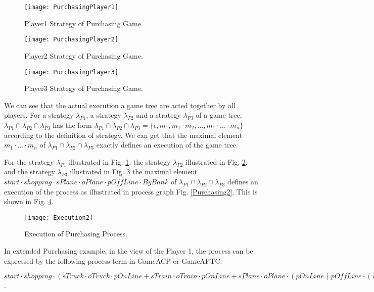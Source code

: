 \documentclass{fac}
\begin{document}
\begin{figure}
  \centering
\texttt{[image: PurchasingPlayer1]}
  \caption{Player1 Strategy of Purchasing Game.}
  \label{PurchasingPlayer1}
\end{figure}

\begin{figure}
  \centering
\texttt{[image: PurchasingPlayer2]}
  \caption{Player2 Strategy of Purchasing Game.}
  \label{PurchasingPlayer2}
\end{figure}

\begin{figure}
  \centering
\texttt{[image: PurchasingPlayer3]}
  \caption{Player3 Strategy of Purchasing Game.}
  \label{PurchasingPlayer3}
\end{figure}

We can see that the actual execution a game tree are acted together by all players. For a strategy $\lambda_{P1}$, a strategy $\lambda_{P2}$ and a strategy $\lambda_{P3}$ of a game tree, $\lambda_{P1} \cap \lambda_{P2} \cap \lambda_{P3}$ has the form $\lambda_{P1} \cap \lambda_{P2} \cap \lambda_{P3}=\{\epsilon,m_1,m_1\cdot m_2,...,m_1\cdot...\cdot m_n\}$ according to the definition of strategy. We can get that the maximal element $m_1\cdot...\cdot m_n$ of $\lambda_{P1} \cap \lambda_{P2} \cap \lambda_{P3}$ exactly defines an execution of the game tree.

For the strategy $\lambda_{P1}$ illustrated in Fig. \ref{PurchasingPlayer1}, the strategy $\lambda_{P2}$ illustrated in Fig. \ref{PurchasingPlayer2}, and the strategy $\lambda_{P3}$ illustrated in Fig. \ref{PurchasingPlayer3} the maximal element $start\cdot shopping\cdot sPlane \cdot oPlane \cdot pOffLine \cdot ByBank$ of $\lambda_{P1} \cap \lambda_{P2} \cap \lambda_{P3}$ defines an execution of the process as illustrated in process graph Fig. \ref{Purchasing2}. This is shown in Fig. \ref{Execution2}.

\begin{figure}
  \centering
\texttt{[image: Execution2]}
  \caption{Execution of Purchasing Process.}
  \label{Execution2}
\end{figure}

In extended Purchasing example, in the view of the Player 1, the process can be expressed by the following process term in GameACP or GameAPTC.

$start\cdot shopping\cdot (sTruck\cdot oTruck\cdot pOnLine + sTrain\cdot oTrain\cdot pOnLine + sPlane \cdot oPlane \cdot (pOnLine \ddagger pOffLine \cdot (ByCheck \ddagger ByBank)))$.
\end{document}
